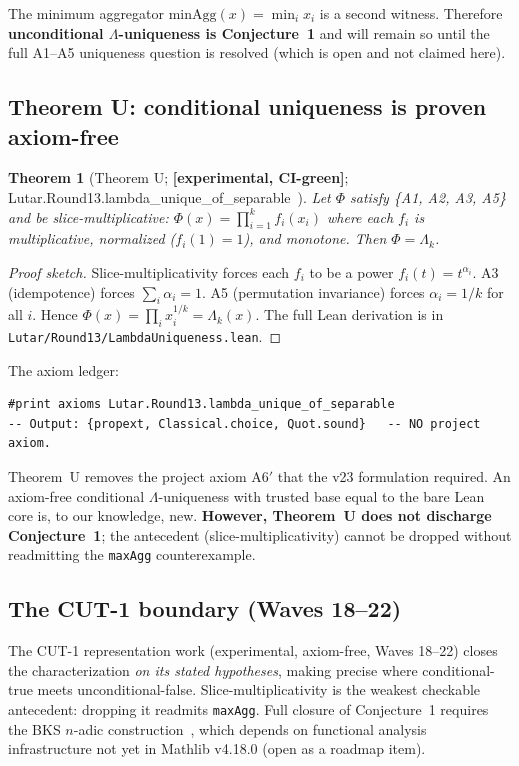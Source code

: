 \documentclass[11pt,letterpaper]{article}
\newcommand{\lean}[1]{{\small\ttfamily #1}}
\newcommand{\lb}{\discretionary{}{}{}}
\newtheorem{theorem}{Theorem}[section]
\theoremstyle{definition}
\newcommand{\Lam}{\Lambda}
\newcommand{\experimental}{\textbf{[experimental, CI-green]}}
\begin{document}
\noindent The minimum aggregator $\mathrm{minAgg}(x) = \min_i x_i$ is a second
witness.  Therefore \textbf{unconditional $\Lam$-uniqueness is Conjecture~1}
and will remain so until the full A1--A5 uniqueness question is resolved
(which is open and not claimed here).

\subsection{Theorem U: conditional uniqueness is proven axiom-free}

\begin{theorem}[Theorem U; \experimental{};
  \lean{Lutar.\lb Round13.\lb lambda\_\lb unique\_\lb of\_\lb separable}~\cite{szl_v24,szl_concept}]
\label{thm:U}
Let $\Phi$ satisfy \{A1, A2, A3, A5\} and be \emph{slice-multiplicative}:
$\Phi(x) = \prod_{i=1}^k f_i(x_i)$ where each $f_i$ is multiplicative,
normalized ($f_i(1)=1$), and monotone.  Then $\Phi = \Lam_k$.
\end{theorem}

\begin{proof}[Proof sketch]
Slice-multiplicativity forces each $f_i$ to be a power $f_i(t) = t^{\alpha_i}$.
A3 (idempotence) forces $\sum_i \alpha_i = 1$.  A5 (permutation invariance)
forces $\alpha_i = 1/k$ for all $i$.  Hence $\Phi(x) = \prod_i x_i^{1/k} =
\Lam_k(x)$.  The full Lean derivation is in
\texttt{Lutar/Round13/LambdaUniqueness.lean}.
\end{proof}

\noindent The axiom ledger:
\begin{lstlisting}
#print axioms Lutar.Round13.lambda_unique_of_separable
-- Output: {propext, Classical.choice, Quot.sound}   -- NO project axiom.
\end{lstlisting}

\noindent Theorem~U removes the project axiom A6$'$ that the v23 formulation
required.  An axiom-free conditional $\Lam$-uniqueness with trusted base equal
to the bare Lean core is, to our knowledge, new.  \textbf{However, Theorem~U
does not discharge Conjecture~1}; the antecedent (slice-multiplicativity) cannot
be dropped without readmitting the \texttt{maxAgg} counterexample.

\subsection{The CUT-1 boundary (Waves 18--22)}

The CUT-1 representation work (experimental, axiom-free, Waves 18--22) closes the
characterization \emph{on its stated hypotheses}, making precise where
conditional-true meets unconditional-false.  Slice-multiplicativity is the weakest
checkable antecedent: dropping it readmits \texttt{maxAgg}.  Full closure of
Conjecture~1 requires the BKS $n$-adic construction~\cite{aczel1966}, which
depends on functional analysis infrastructure not yet in Mathlib v4.18.0 (open
as a roadmap item).
\end{document}
